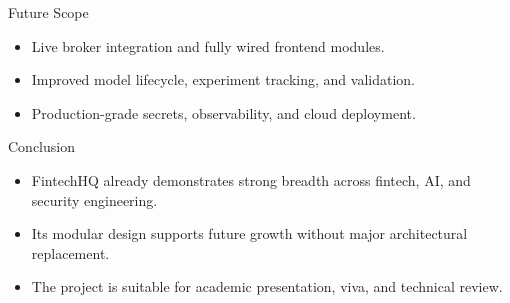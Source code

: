 \documentclass{beamer}
\begin{document}
\begin{frame}{Future Scope}
\begin{itemize}
\item Live broker integration and fully wired frontend modules.
\item Improved model lifecycle, experiment tracking, and validation.
\item Production-grade secrets, observability, and cloud deployment.
\end{itemize}
\end{frame}
\begin{frame}{Conclusion}
\begin{itemize}
\item FintechHQ already demonstrates strong breadth across fintech, AI, and security engineering.
\item Its modular design supports future growth without major architectural replacement.
\item The project is suitable for academic presentation, viva, and technical review.
\end{itemize}
\end{frame}
\end{document}
